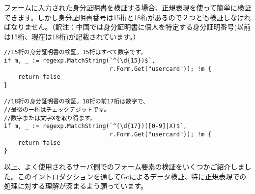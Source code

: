 フォームに入力された身分証明書を検証する場合、正規表現を使って簡単に検証できます。しかし身分証明書番号は15桁と18桁があるので２つとも検証しなければなりません。（訳注：中国では身分証明書に個人を特定する身分証明番号(以前は15桁、現在は18桁)が記載されています。）

\begin{lstlisting}[numbers=none]
//15桁の身分証明書の検証。15桁はすべて数字です。
if m, _ := regexp.MatchString(`^(\d{15})$`,
                              r.Form.Get("usercard")); !m {
    return false
}

//18桁の身分証明書の検証。18桁の前17桁は数字で、
//最後の一桁はチェックデジットです。
//数字または文字Xを取り得ます。
if m, _ := regexp.MatchString(`^(\d{17})([0-9]|X)$`,
                              r.Form.Get("usercard")); !m {
    return false
}
\end{lstlisting}

以上、よく使用されるサーバ側でのフォーム要素の検証をいくつかご紹介しました。このイントロダクションを通してGoによるデータ検証、特に正規表現での処理に対する理解が深まるよう願っています。


